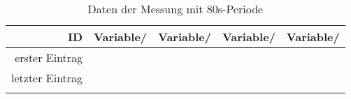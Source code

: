 \begin{longtable}{rrlll}
	\hline
	{ID}&{Variable/\si{}} &{Variable/\si{}}&{Variable/\si{}}&{Variable/\si{}}\\
	\hline
	\endhead
		erster Eintrag \\
		letzter Eintrag \\ 
	\caption{Daten der Messung mit 80s-Periode}
	\label{label}
\end{longtable}
